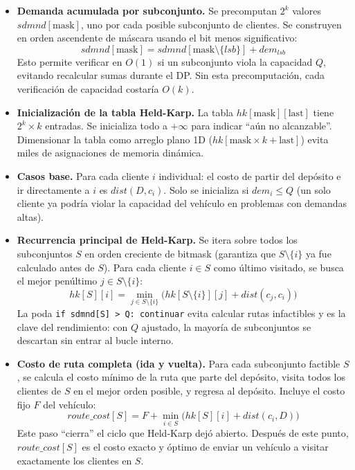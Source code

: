 \documentclass[12pt,a4paper]{article}
\begin{document}
\begin{itemize}[leftmargin=2cm]
\item[\textbf{L.1}] \textbf{Demanda acumulada por subconjunto.} Se precomputan $2^k$ valores $sdmnd[\text{mask}]$, uno por cada posible subconjunto de clientes. Se construyen en orden ascendente de máscara usando el bit menos significativo:
$$sdmnd[\text{mask}] = sdmnd[\text{mask} \setminus \{lsb\}] + dem_{lsb}$$
Esto permite verificar en $O(1)$ si un subconjunto viola la capacidad $Q$, evitando recalcular sumas durante el DP. Sin esta precomputación, cada verificación de capacidad costaría $O(k)$.

\item[\textbf{L.2}] \textbf{Inicialización de la tabla Held-Karp.} La tabla $hk[\text{mask}][\text{last}]$ tiene $2^k \times k$ entradas. Se inicializa todo a $+\infty$ para indicar ``aún no alcanzable''. Dimensionar la tabla como arreglo plano 1D ($hk[\text{mask} \times k + \text{last}]$) evita miles de asignaciones de memoria dinámica.

\item[\textbf{L.3--4}] \textbf{Casos base.} Para cada cliente $i$ individual: el costo de partir del depósito e ir directamente a $i$ es $dist(D, c_i)$. Solo se inicializa si $dem_i \leq Q$ (un solo cliente ya podría violar la capacidad del vehículo en problemas con demandas altas).

\item[\textbf{L.5--9}] \textbf{Recurrencia principal de Held-Karp.} Se itera sobre todos los subconjuntos $S$ en orden creciente de bitmask (garantiza que $S \setminus \{i\}$ ya fue calculado antes de $S$). Para cada cliente $i \in S$ como último visitado, se busca el mejor penúltimo $j \in S \setminus \{i\}$:
$$hk[S][i] = \min_{j \in S \setminus \{i\}} \bigl( hk[S \setminus \{i\}][j] + dist(c_j, c_i) \bigr)$$
La poda \texttt{if sdmnd[S] > Q: continuar} evita calcular rutas infactibles y es la clave del rendimiento: con $Q$ ajustado, la mayoría de subconjuntos se descartan sin entrar al bucle interno.

\item[\textbf{L.10--12}] \textbf{Costo de ruta completa (ida y vuelta).} Para cada subconjunto factible $S$, se calcula el costo mínimo de la ruta que parte del depósito, visita todos los clientes de $S$ en el mejor orden posible, y regresa al depósito. Incluye el costo fijo $F$ del vehículo:
$$route\_cost[S] = F + \min_{i \in S} \bigl( hk[S][i] + dist(c_i, D) \bigr)$$
Este paso ``cierra'' el ciclo que Held-Karp dejó abierto. Después de este punto, $route\_cost[S]$ es el costo exacto y óptimo de enviar un vehículo a visitar exactamente los clientes en $S$.


\end{itemize}
\end{document}
